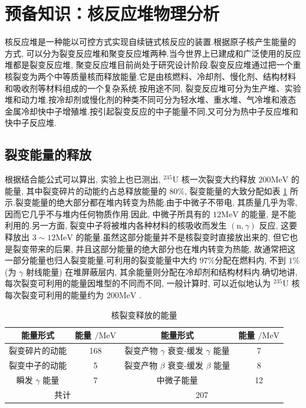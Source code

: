 \documentclass{Sichuan Normal University}
\begin{document}
\section{预备知识：核反应堆物理分析}

核反应堆是一种能以可控方式实现自续链式核反应的装置.根据原子核产生能量的方式, 可以分为裂变反应堆和聚变反应堆两种\cite{XieZhongShengHeFanYingDuiWuLiFenXi2020}.当今世界上已建成和广泛使用的反应堆都是裂变反应堆, 聚变反应堆目前尚处于研究设计阶段.裂变反应堆通过把一个重核裂变为两个中等质量核而释放能量.它是由核燃料、冷却剂、慢化剂、结构材料和吸收剂等材料组成的一个复杂系统.按用途不同, 裂变反应堆可分为生产堆、实验堆和动力堆.按冷却剂或慢化剂的种类不同可分为轻水堆、重水堆、气冷堆和液态金属冷却快中子增殖堆.按引起裂变反应的中子能量不同,又可分为热中子反应堆和快中子反应堆.

\subsection{裂变能量的释放}

根据结合能公式可以算出, 实验上也已测出, ${ }^{235} \mathrm{U}$ 核一次裂变大约释放 $200 \mathrm{MeV}$ 的能量,
其中裂变碎片的动能约占总释放能量的 $80 \%$, 裂变能量的大致分配如表 \ref{tab:核裂变释放的能量} 所示.裂变能量的绝大部分都在堆内转变为热能.由于中微子不带电, 其质量几乎为零, 因而它几乎不与堆内任何物质作用.因此, 中微子所具有的 $12 \mathrm{MeV}$ 的能量, 是不能利用的.另一方面, 裂变中子将被堆内各种材料的核吸收而发生 $(\mathrm{n}, \gamma)$ 反应, 这要释放出 $3 \sim 12 \mathrm{MeV}$ 的能量.虽然这部分能量并不是核裂变时直接放出来的, 但它也是裂变带来的后果, 并且这部分能量的绝大部分也在堆内转变为热能, 故通常把这一部分能量也归人裂变能量.可利用的裂变能量中大约 $97 \%$分配在燃料内, 不到 $1 \%$ (为 $\gamma$ 射线能量) 在堆屏蔽层内, 其余能量则分配在冷却剂和结构材料内.确切地讲, 每次裂变可利用的能量因堆型的不同而不同, 一般计算时, 可以近似地认为 ${ }^{235} \mathrm{U}$ 核每次裂变可利用的能量约为 $200 \mathrm{MeV}$ .

\begin{table}[H]
    \caption{核裂变释放的能量}
    \label{tab:核裂变释放的能量}
    \centering
    \begin{tabular}{cc|cc}
        \toprule 
        能量形式 & 能量 $/ \mathrm{MeV}$ & 能量形式 & 能量 $/ \mathrm{MeV}$\\
        \midrule 
        裂变碎片的动能 & 168 & 裂变产物 $\gamma$ 衰变-缓发 $\gamma$ 能量 & 7\\
        裂变中子的动能 & 5 & 裂变产物 $\beta$ 衰变-缓发 $\beta$ 能量 & 8\\
        瞬发 $\gamma$ 能量 & 7 & 中微子能量 & 12\\
        \midrule
        \multicolumn{2}{c}{共计} & \multicolumn{2}{c}{207} \\
        \bottomrule
    \end{tabular}
\end{table}
    
\end{document}
